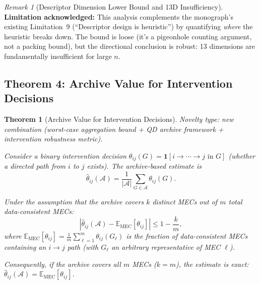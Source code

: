 \documentclass{article}
\theoremstyle{definition}
\theoremstyle{plain}
\newtheorem{theorem}{Theorem}
\theoremstyle{remark}
\newtheorem{remark}{Remark}
\begin{document}
\begin{remark}[Descriptor Dimension Lower Bound and 13D Insufficiency]
\textbf{Limitation acknowledged:} This analysis complements the monograph's existing
Limitation~9 (``Descriptor design is heuristic'') by quantifying \emph{where} the
heuristic breaks down. The bound is loose (it's a pigeonhole counting argument,
not a packing bound), but the directional conclusion is robust: 13 dimensions are
fundamentally insufficient for large $n$.
\end{remark}

\subsection{Theorem 4: Archive Value for Intervention Decisions}

\begin{theorem}[Archive Value for Intervention Decisions]
\label{thm:intervention}
\emph{Novelty type: new combination (worst-case aggregation bound + QD archive
framework + intervention robustness metric).}

Consider a binary intervention decision
$\theta_{ij}(G) = \mathbf{1}[i \to \cdots \to j \text{ in } G]$ (whether a
directed path from $i$ to $j$ exists). The archive-based estimate is
$$\hat{\theta}_{ij}(\mathcal{A})
= \frac{1}{|\mathcal{A}|}\sum_{G \in \mathcal{A}} \theta_{ij}(G).$$

Under the assumption that the archive covers $k$ distinct MECs out of $m$ total
data-consistent MECs:
\begin{equation}
  \label{eq:intervention_bound}
  \left|\hat{\theta}_{ij}(\mathcal{A})
  - \mathbb{E}_{\mathrm{MEC}}[\theta_{ij}]\right| \leq 1 - \frac{k}{m},
\end{equation}
where $\mathbb{E}_{\mathrm{MEC}}[\theta_{ij}]
= \frac{1}{m}\sum_{\ell=1}^m \theta_{ij}(G_\ell)$ is the fraction of
data-consistent MECs containing an $i \to j$ path (with $G_\ell$ an arbitrary
representative of MEC $\ell$).

Consequently, if the archive covers all $m$ MECs ($k = m$), the estimate is
exact: $\hat{\theta}_{ij}(\mathcal{A}) = \mathbb{E}_{\mathrm{MEC}}[\theta_{ij}]$.
\end{theorem}
\end{document}
